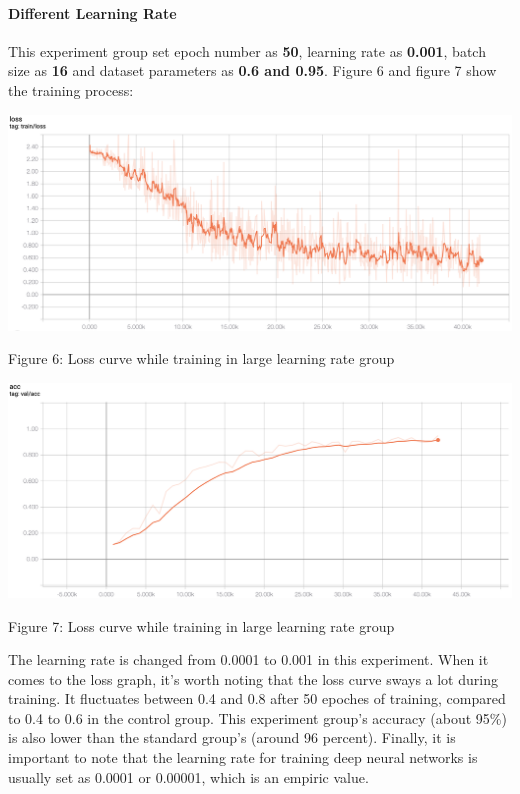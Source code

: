\documentclass[11pt]{article}
\begin{document}
    \hypertarget{different-learning-rate}{%
\paragraph{Different Learning Rate}\label{different-learning-rate}}

This experiment group set epoch number as \textbf{50}, learning rate as
\textbf{0.001}, batch size as \textbf{16} and dataset parameters as
\textbf{0.6 and 0.95}. Figure 6 and figure 7 show the training process:

    \includegraphics{../pics/LR_1.png}

Figure 6: Loss curve while training in large learning rate group

\includegraphics{../pics/LR_2.png}

Figure 7: Loss curve while training in large learning rate group

    The learning rate is changed from 0.0001 to 0.001 in this experiment.
When it comes to the loss graph, it's worth noting that the loss curve
sways a lot during training. It fluctuates between 0.4 and 0.8 after 50
epoches of training, compared to 0.4 to 0.6 in the control group. This
experiment group's accuracy (about 95\%) is also lower than the standard
group's (around 96 percent). Finally, it is important to note that the 
learning rate for training deep neural networks is usually set as 0.0001 
or 0.00001, which is an empiric value.
\end{document}
